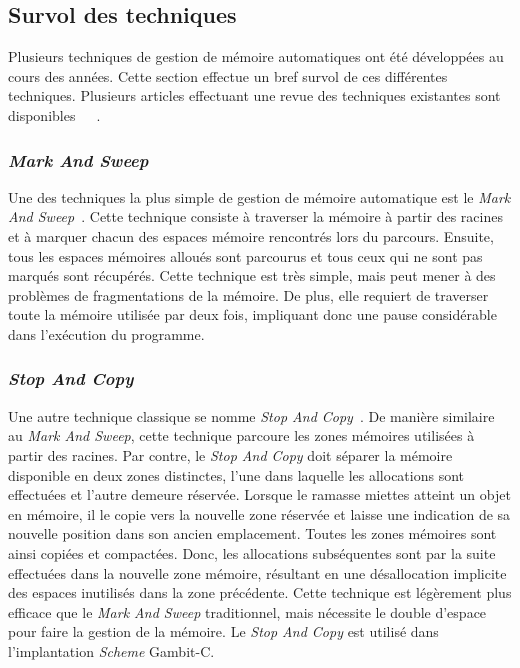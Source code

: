 \documentclass[12pt,twoside,letterpaper,francais]{book}
\newcommand{\Schemelang}{{\textit{Scheme }}}
\begin{document}
\FloatBarrier
\subsection{Survol des techniques}
Plusieurs techniques de gestion de mémoire automatiques ont été
développées au cours des années. Cette section effectue un bref survol
de ces différentes techniques. Plusieurs articles effectuant une revue
des techniques existantes sont
disponibles~\cite{GC_REVIEW1}~\cite{GC_REVIEW2}~\cite{GC_REVIEW3}.


\FloatBarrier
\subsubsection{\textit{Mark And Sweep}}
Une des techniques la plus simple de gestion de mémoire automatique
est le \textit{Mark And Sweep}~\cite{LISP_ORIGINS}. Cette technique
consiste à traverser la mémoire à partir des racines et à marquer
chacun des espaces mémoire rencontrés lors du parcours. Ensuite, tous
les espaces mémoires alloués sont parcourus et tous ceux qui ne sont
pas marqués sont récupérés. Cette technique est très simple, mais peut
mener à des problèmes de fragmentations de la mémoire. De plus, elle
requiert de traverser toute la mémoire utilisée par deux fois,
impliquant donc une pause considérable dans l'exécution du programme.


\FloatBarrier
\subsubsection{\textit{Stop And Copy}}
Une autre technique classique se nomme \textit{Stop And
  Copy}~\cite{STOP_AND_COPY}. De manière similaire au \textit{Mark And
  Sweep}, cette technique parcoure les zones mémoires utilisées à
partir des racines. Par contre, le \textit{Stop And Copy} doit séparer
la mémoire disponible en deux zones distinctes, l'une dans laquelle
les allocations sont effectuées et l'autre demeure réservée. Lorsque
le ramasse miettes atteint un objet en mémoire, il le copie vers la
nouvelle zone réservée et laisse une indication de sa nouvelle
position dans son ancien emplacement. Toutes les zones mémoires sont
ainsi copiées et compactées. Donc, les allocations subséquentes sont
par la suite effectuées dans la nouvelle zone mémoire, résultant en
une désallocation implicite des espaces inutilisés dans la zone
précédente. Cette technique est légèrement plus efficace que le
\textit{Mark And Sweep} traditionnel, mais nécessite le double
d'espace pour faire la gestion de la mémoire. Le \textit{Stop And
  Copy} est utilisé dans l'implantation \Schemelang Gambit-C.
\end{document}
